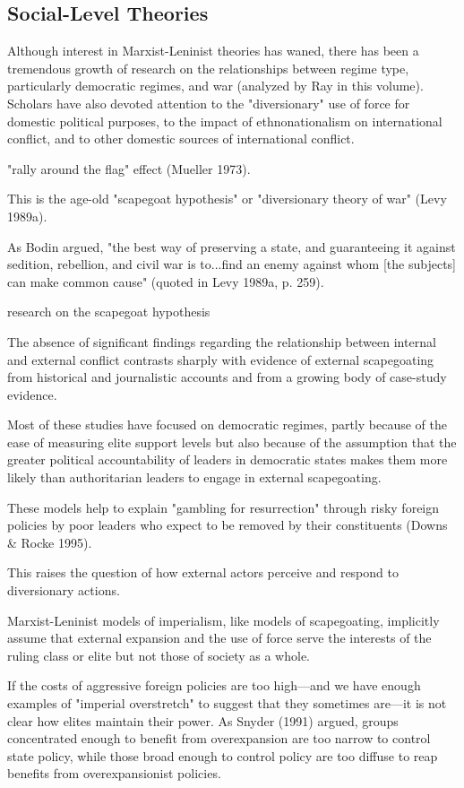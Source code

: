 
\subsection{Social-Level Theories}

Although interest in Marxist-Leninist theories has waned, there has been a tremendous growth of research on the relationships between regime type, particularly democratic regimes, and war (analyzed by Ray in this volume). Scholars have also devoted attention to the "diversionary" use of force for domestic political purposes, to the impact of ethnonationalism on international conflict, and to other domestic sources of international conflict.

"rally around the flag" effect (Mueller 1973).

This is the age-old "scapegoat hypothesis" or "diversionary theory of war" (Levy 1989a).

As Bodin argued, "the best way of preserving a state, and guaranteeing it against sedition, rebellion, and civil war is to...find an enemy against whom [the subjects] can make common cause" (quoted in Levy 1989a, p. 259).

research on the scapegoat hypothesis

The absence of significant findings regarding the relationship between internal and external conflict contrasts sharply with evidence of external scapegoating from historical and journalistic accounts and from a growing body of case-study evidence.

Most of these studies have focused on democratic regimes, partly because of the ease of measuring elite support levels but also because of the assumption that the greater political accountability of leaders in democratic states makes them more likely than authoritarian leaders to engage in external scapegoating.

These models help to explain "gambling for resurrection" through risky foreign policies by poor leaders who expect to be removed by their constituents (Downs \& Rocke 1995).

This raises the question of how external actors perceive and respond to diversionary actions.

Marxist-Leninist models of imperialism, like models of scapegoating, implicitly assume that external expansion and the use of force serve the interests of the ruling class or elite but not those of society as a whole.

If the costs of aggressive foreign policies are too high---and we have enough examples of "imperial overstretch" to suggest that they sometimes are---it is not clear how elites maintain their power. As Snyder (1991) argued, groups concentrated enough to benefit from overexpansion are too narrow to control state policy, while those broad enough to control policy are too diffuse to reap benefits from overexpansionist policies.

